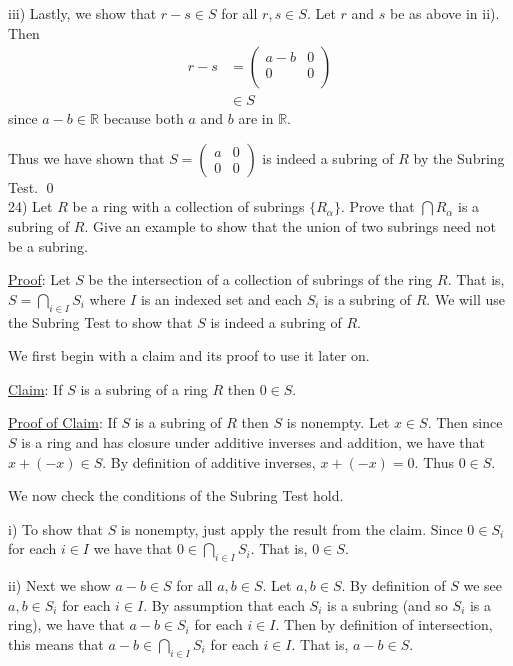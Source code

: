 \documentclass{article}
\begin{document}
iii) Lastly, we show that $r - s \in S$ for all $r, s \in S$. Let $r$ and $s$ be as above in ii). Then
\begin{align*}
	r - s &=
	\begin{pmatrix}
		a - b & 0 \\ 
		0 & 0 \\
	\end{pmatrix} \\
	& \in S
\end{align*} since $a - b \in \mathbb{R}$ because both $a$ and $b$ are in $\mathbb{R}$.

Thus we have shown that $S =
\begin{pmatrix}
a & 0 \\
0 & 0
\end{pmatrix}$ is indeed a subring of $R$ by the Subring Test. \qed \\

24) Let $R$ be a ring with a collection of subrings $\{R_{\alpha}\}$. Prove that $\bigcap R_{\alpha}$ is a subring of $R$. Give an example to show that the union of two subrings need not be a subring.

\underline{Proof}: Let $S$ be the intersection of a collection of subrings of the ring $R$. That is, $S = \underset{i \in I}{\bigcap} S_i$ where $I$ is an indexed set and each $S_i$ is a subring of $R$. We will use the Subring Test to show that $S$ is indeed a subring of $R$.

We first begin with a claim and its proof to use it later on.

\underline{Claim}: If $S$ is a subring of a ring $R$ then $0 \in S$.

\underline{Proof of Claim}: If $S$ is a subring of $R$ then $S$ is nonempty. Let $x \in S$. Then since $S$ is a ring and has closure under additive inverses and addition, we have that $x + (-x) \in S$. By definition of additive inverses, $x + (-x) = 0$. Thus $0 \in S$.

We now check the conditions of the Subring Test hold.

i) To show that $S$ is nonempty, just apply the result from the claim. Since $0 \in S_i$ for each $i \in I$ we have that $0 \in \underset{i \in I}{\bigcap} S_i$. That is, $0 \in S$.

ii) Next we show $a - b \in S$ for all $a, b \in S$. Let $a, b \in S$. By definition of $S$ we see $a, b \in S_i$ for each $i \in I$. By assumption that each $S_i$ is a subring (and so $S_i$ is a ring), we have that $a - b \in S_i$ for each $i \in I$. Then by definition of intersection, this means that $a - b \in \underset{i \in I}{\bigcap} S_i$ for each $i \in I$. That is, $a - b \in S$.
\end{document}
